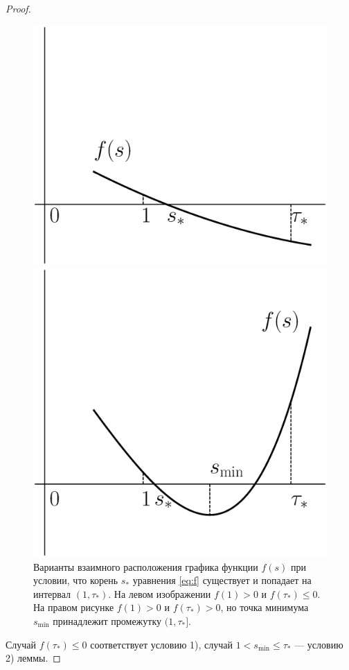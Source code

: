 \begin{proof}
\begin{figure}[ht]
	\centering
	\begin{minipage}{.45\linewidth}
		\includegraphics[width=\linewidth]{images/f2.eps}
	\end{minipage}
	\hspace{.05\linewidth}
	\begin{minipage}{.45\linewidth}
		\includegraphics[width=\linewidth]{images/f1.eps}
	\end{minipage}
	\caption{Варианты взаимного расположения графика функции $f(s)$ при условии, что корень $s_*$ уравнения \eqref{eq:f} существует и попадает на интервал $(1,\tau_*)$. На левом изображении $f(1) > 0$ и $f(\tau_*) \leq 0$. На правом рисунке $f(1) > 0$ и $f(\tau_*) > 0$, но точка минимума $s_{\min}$ принадлежит промежутку $(1,\tau_*]$.}
	\label{fig:tau_star}
\end{figure}

Случай $f(\tau_*) \leq 0$ соответствует условию 1), случай $1 < s_{\min} \leqslant \tau_*$ --- условию 2) леммы. 
\end{proof}

